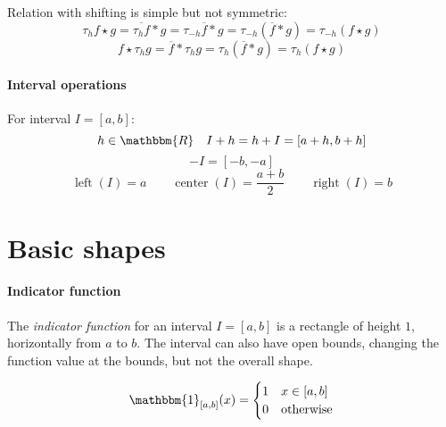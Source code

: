 \documentclass[a4paper,10pt]{article}
\newcommand\R{\mathbbm{R}}
\newcommand\Convolution{\ast}
\newcommand\Correlation{\star}
\newcommand\Reversed[1]{\overline{#1}}
\newcommand\Indicator[1]{\mathbbm{1}_{#1}}
\DeclareMathOperator{\IntervalLeft}{left}
\DeclareMathOperator{\IntervalRight}{right}
\DeclareMathOperator{\IntervalCenter}{center}
\begin{document}
Relation with shifting is simple but not symmetric:
\[
    \tau_h f \Correlation g = \Reversed{\tau_h f} \Convolution g = \tau_{-h} \Reversed{f} \Convolution g =
    \tau_{-h} (\Reversed{f} \Convolution g) = \tau_{-h} (f \Correlation g)
\]
\[ f \Correlation \tau_h g = \Reversed{f} \Convolution \tau_h g = \tau_h (\Reversed{f} \Convolution g) = \tau_h (f \Correlation g) \]

\paragraph{Interval operations}
For interval $I = [a,b]$:
\[ h \in \R \quad I + h = h + I = [a + h, b + h] \]
\[ -I = [-b, -a] \]
\[ \IntervalLeft(I) = a \qquad \IntervalCenter(I) = \frac{a+b}{2} \qquad \IntervalRight(I) = b \]

\section{Basic shapes}

\paragraph{Indicator function}

The \emph{indicator function} for an interval $I = [a,b]$ is a rectangle of height $1$, horizontally from $a$ to $b$.
The interval can also have open bounds, changing the function value at the bounds, but not the overall shape.
\begin{center}\end{center}
\[
    \Indicator{[a,b]}(x) = \begin{cases}
        1 & x \in \left[ a, b \right] \\
        0 & \text{otherwise}
    \end{cases}
\]
\end{document}
